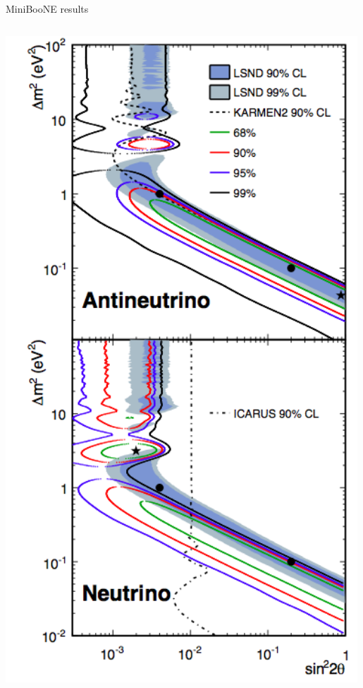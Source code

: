 \begin{frame}[t]{MiniBooNE results}
\begin{columns}[T]
\begin{column}{0.35\textwidth}
    \includegraphics[width=0.99\textwidth]{./images/beyond3nu/accelerator/miniboone_osc_results_contours.png}
  \end{column}
\end{columns}
\end{frame}

%
%
%

